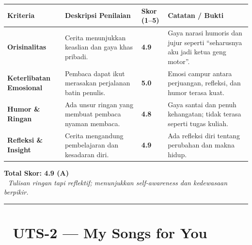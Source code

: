 \documentclass[
  letterpaper,
  DIV=11,
  numbers=noendperiod]{scrreprt}
\begin{document}
\begin{longtable}[]{@{}
  >{\raggedright\arraybackslash}p{}
  >{\raggedright\arraybackslash}p{}
  >{\raggedright\arraybackslash}p{}
  >{\raggedright\arraybackslash}p{}@{}}
\toprule\noalign{}
\begin{minipage}[b]{\linewidth}\raggedright
\textbf{Kriteria}
\end{minipage} & \begin{minipage}[b]{\linewidth}\raggedright
\textbf{Deskripsi Penilaian}
\end{minipage} & \begin{minipage}[b]{\linewidth}\raggedright
\textbf{Skor (1--5)}
\end{minipage} & \begin{minipage}[b]{\linewidth}\raggedright
\textbf{Catatan / Bukti}
\end{minipage} \\
\midrule\noalign{}
\endhead
\bottomrule\noalign{}
\endlastfoot
\textbf{Orisinalitas} & Cerita menunjukkan keaslian dan gaya khas
pribadi. & \textbf{4.9} & Gaya narasi humoris dan jujur seperti
``seharusnya aku jadi ketua geng motor''. \\
\textbf{Keterlibatan Emosional} & Pembaca dapat ikut merasakan
perjalanan batin penulis. & \textbf{5.0} & Emosi campur antara
perjuangan, refleksi, dan humor terasa kuat. \\
\textbf{Humor \& Ringan} & Ada unsur ringan yang membuat pembaca nyaman
membaca. & \textbf{4.8} & Gaya santai dan penuh kehangatan; tidak terasa
seperti tugas kuliah. \\
\textbf{Refleksi \& Insight} & Cerita mengandung pembelajaran dan
kesadaran diri. & \textbf{4.9} & Ada refleksi diri tentang perubahan dan
makna hidup. \\
\end{longtable}

\textbf{Total Skor: 4.9 (A)}\\
📝 \emph{Tulisan ringan tapi reflektif; menunjukkan self-awareness dan
kedewasaan berpikir.}

\begin{center}\rule{0.5\linewidth}{0.5pt}\end{center}

\section{🎵 UTS-2 --- My Songs for You}\label{uts-2-my-songs-for-you-1}
\end{document}
